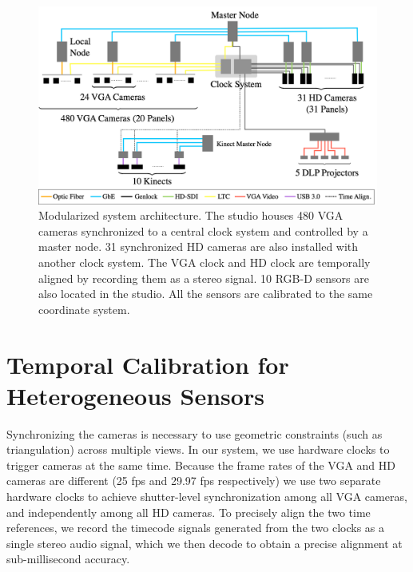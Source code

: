 \begin{figure}[t]
	\includegraphics[width=\linewidth]{figures/Dome_architecture_0815}
	\caption{Modularized system architecture. The studio houses 480 VGA cameras synchronized to a central clock system and controlled by a master node. 31 synchronized HD cameras are also installed with another clock system. The VGA clock and HD clock are temporally aligned by recording them as a stereo signal. 10 RGB-D sensors are also located in the studio. All the sensors are calibrated to the same coordinate system.}
	\label{fig:architecture}
\end{figure}

\section{Temporal Calibration for Heterogeneous Sensors}
Synchronizing the cameras is necessary to use geometric constraints (such as triangulation) across multiple views. In our system, we use hardware clocks to trigger cameras at the same time. Because the frame rates of the VGA and HD cameras are different (25 fps and 29.97 fps respectively) we use two separate hardware clocks to achieve shutter-level synchronization among all VGA cameras, and independently among all HD cameras. To precisely align the two time references, we record the timecode signals generated from the two clocks as a single stereo audio signal, which we then decode to obtain a precise alignment at sub-millisecond accuracy. 

